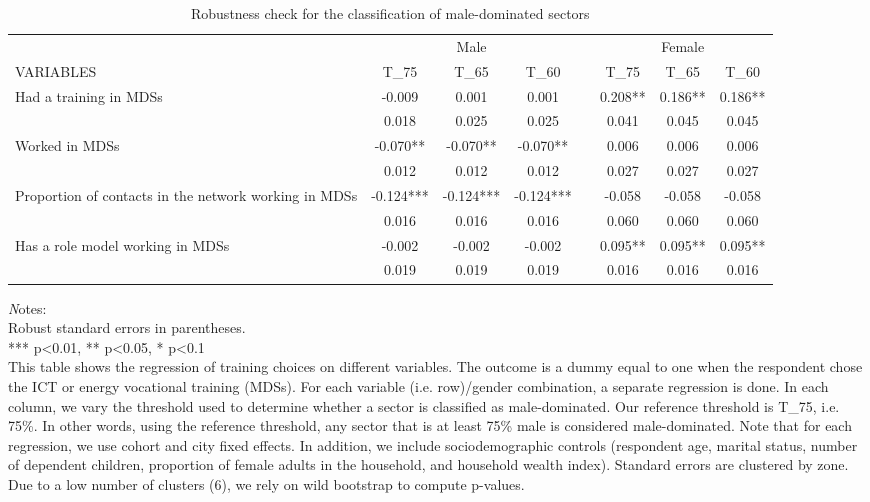 \begin{landscape}
\begin{table}[]
\caption{Robustness check for the classification of male-dominated sectors}
\label{tab:MDS_reg_robustness}
\begin{tabular}{@{}lccccccc@{}}
\toprule
& \multicolumn{3}{c}{Male}        &  & \multicolumn{3}{c}{Female}     \\ \cmidrule(lr){2-4}  \cmidrule(l){6-8}
VARIABLES  & T\_75    & T\_65     & T\_60    &  & T\_75    & T\_65    & T\_60    \\ \midrule
Had a training in MDSs&   -0.009&    0.001&    0.001&&    0.208**&    0.186**&    0.186**\\
&    0.018&    0.025&    0.025&&    0.041&    0.045&    0.045\\
Worked in MDSs&   -0.070**&   -0.070**&   -0.070**&&    0.006&    0.006&    0.006\\
&    0.012&    0.012&    0.012&&    0.027&    0.027&    0.027\\
Proportion of contacts in the network working in MDSs&   -0.124***&   -0.124***&   -0.124***&&   -0.058&   -0.058&   -0.058\\
&    0.016&    0.016&    0.016&&    0.060&    0.060&    0.060\\
Has a role model working in MDSs&   -0.002&   -0.002&   -0.002&&    0.095**&    0.095**&    0.095**\\
&    0.019&    0.019&    0.019&&    0.016&    0.016&    0.016\\
\midrule
\end{tabular}
\begin{minipage}{21cm}
\small{
{\textit Notes:} \\
Robust standard errors in parentheses. \\
*** p\textless{}0.01, ** p\textless{}0.05, * p\textless{}0.1 \\
This table shows the regression of training choices on different variables. The outcome is a dummy equal to one when the respondent chose the ICT or energy vocational training (MDSs). For each variable (i.e. row)/gender combination, a separate regression is done. In each column, we vary the threshold used to determine whether a sector is classified as male-dominated.  Our reference threshold is T\_75, i.e. 75\%. In other words, using the reference threshold, any sector that is at least 75\% male is considered male-dominated. Note that for each regression, we use cohort and city fixed effects. In addition, we include sociodemographic controls (respondent age, marital status, number of dependent children, proportion of female adults in the household, and household wealth index). Standard errors are clustered by zone. Due to a low number of clusters (6), we rely on wild bootstrap to compute p-values.
}
\end{minipage}
\end{table}
\end{landscape}
